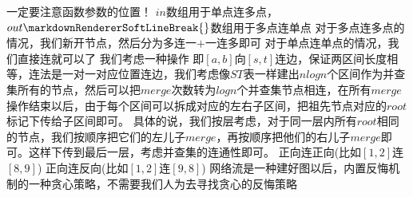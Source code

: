 {}\markdownRendererSectionBegin
{}\markdownRendererInterblockSeparator
{}一定要注意函数参数的位置！\markdownRendererParagraphSeparator
{}$ in $数组用于单点连多点，$ out\markdownRendererSoftLineBreak
{}$数组用于多点连单点\markdownRendererParagraphSeparator
{}对于多点连多点的情况，我们新开节点，然后分为多连一$ + $一连多即可\markdownRendererParagraphSeparator
{}对于单点连单点的情况，我们直接连就可以了\markdownRendererInterblockSeparator
{}\markdownRendererInterblockSeparator
{}
\markdownRendererSectionEnd \markdownRendererSectionBegin
{}\markdownRendererInterblockSeparator
{}\markdownRendererInterblockSeparator
{}
\markdownRendererSectionEnd \markdownRendererSectionBegin
{}\markdownRendererInterblockSeparator
{}我们考虑一种操作 即$ [a,b] $向$ [s,t] $连边，保证两区间长度相等，连法是一对一对应位置连边，我们考虑像$ ST $表一样建出$ nlogn $个区间作为并查集所有的节点，然后可以把$ merge $次数转为$ logn $个并查集节点相连，在所有$ merge $操作结束以后，由于每个区间可以拆成对应的左右子区间，把祖先节点对应的$ root $标记下传给子区间即可。\markdownRendererParagraphSeparator
{}具体的说，我们按层考虑，对于同一层内所有$ root $相同的节点，我们按顺序把它们的左儿子$ merge $，再按顺序把他们的右儿子$ merge $即可。这样下传到最后一层，考虑并查集的连通性即可。\markdownRendererParagraphSeparator
{}正向连正向(比如$ [1,2] $连$ [8,9] $)\markdownRendererInterblockSeparator
{}\markdownRendererInterblockSeparator
{}正向连反向(比如$ [1,2] $连$ [9,8] $)\markdownRendererInterblockSeparator
{}\markdownRendererInterblockSeparator
{}
\markdownRendererSectionEnd \markdownRendererSectionBegin
{}\markdownRendererInterblockSeparator
{}\markdownRendererInterblockSeparator
{}
\markdownRendererSectionEnd 
\markdownRendererSectionEnd \markdownRendererSectionBegin
{}\markdownRendererInterblockSeparator
{}网络流是一种建好图以后，内置反悔机制的一种贪心策略，不需要我们人为去寻找贪心的反悔策略\markdownRendererParagraphSeparator
